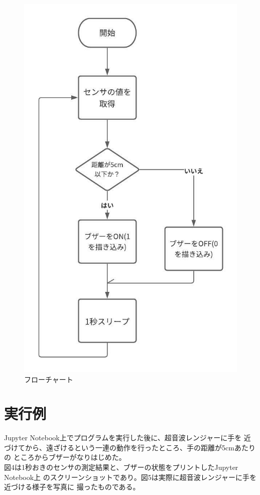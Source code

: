 \documentclass[dvipdfmx,autodetect-engine,titlepage]{jsarticle}
\begin{document}
  \begin{figure}[h]
    \centering
    \includegraphics[scale=0.4]{pic3.jpeg}
    \caption{フローチャート}
\end{figure}

\section{実行例}
Jupyter Notebook上でプログラムを実行した後に、超音波レンジャーに手を
近づけてから、遠ざけるという一連の動作を行ったところ、手の距離が5cmあたりの
ところからブザーがなりはじめた。\\
図4は1秒おきのセンサの測定結果と、ブザーの状態をプリントしたJupyter Notebook上
のスクリーンショットであり。図5は実際に超音波レンジャーに手を近づける様子を写真に
撮ったものである。
\end{document}
